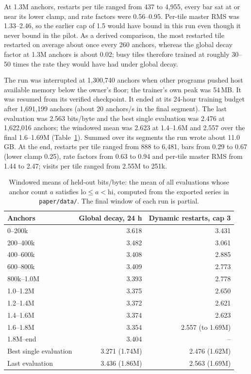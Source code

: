 \documentclass[10pt]{article}
\newcommand{\bpb}{bits/byte}
\newcommand{\code}[1]{\texttt{#1}}
\begin{document}
At 1.3M anchors, restarts per tile ranged from 437 to 4,955, every bar sat at or near its lower clamp,
and rate factors were 0.56--0.95. Per-tile master RMS was 1.33--2.46, so the earlier cap of 1.5 would
have bound in this run even though it never bound in the pilot. As a derived comparison, the most
restarted tile restarted on average about once every 260 anchors, whereas the global decay factor at
1.3M anchors is about 0.02; busy tiles therefore trained at roughly 30--50 times the rate they would
have had under global decay.

The run was interrupted at 1,300,740 anchors when other programs pushed host available memory below the
owner's floor; the trainer's own peak was 54\,MB. It was resumed from its verified checkpoint. It ended at its 24-hour training budget after 1,691,199 anchors (about 20 anchors/s in the final segment). The last evaluation was 2.563 \bpb{} and the best single evaluation was 2.476 at 1,622,016 anchors; the windowed mean was 2.623 at 1.4--1.6M and 2.557 over the final 1.6--1.69M (Table~\ref{tab:windows}). Summed over its segments the run wrote about 11.0\,GB. At the end, restarts per tile ranged from 888 to 6,481, bars from 0.29 to 0.67 (lower clamp 0.25), rate factors from 0.63 to 0.94 and per-tile master RMS from 1.44 to 2.47; visits per tile ranged from 2.55M to 251k.

\begin{table}[t]
\centering
\caption{Windowed means of held-out \bpb: the mean of all evaluations whose anchor count $a$
satisfies $\text{lo}\le a<\text{hi}$, computed from the exported series in \code{paper/data/}. The
final window of each run is partial.}
\label{tab:windows}
\begin{tabular}{lrr}
\toprule
Anchors & Global decay, 24 h & Dynamic restarts, cap 3 \\
\midrule
0--200k & 3.618 & 3.431 \\
200--400k & 3.482 & 3.061 \\
400--600k & 3.408 & 2.885 \\
600--800k & 3.409 & 2.773 \\
800k--1.0M & 3.393 & 2.778 \\
1.0--1.2M & 3.375 & 2.650 \\
1.2--1.4M & 3.372 & 2.621 \\
1.4--1.6M & 3.374 & 2.623 \\
1.6--1.8M & 3.354 & 2.557 (to 1.69M) \\
1.8M--end & 3.404 & -- \\
\midrule
Best single evaluation & 3.271 (1.74M) & 2.476 (1.62M) \\
Last evaluation & 3.436 (1.86M) & 2.563 (1.69M) \\
\bottomrule
\end{tabular}
\end{table}
\end{document}
